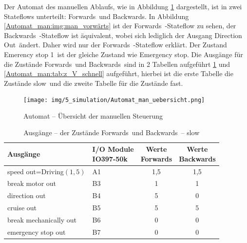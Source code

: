 Der Automat des manuellen Ablaufs, wie in Abbildung \ref{Automat_man:img:man_übersicht} dargestellt, ist in zwei Stateflows unterteilt: \frqq Forwards\flqq\ und \frqq Backwards\flqq . In Abbildung \ref{Automat_man:img:man_vorwärts} ist der \frqq Forwards\flqq\ -Stateflow zu sehen, der \frqq Backwards\flqq\ -Stateflow ist äquivalent, wobei sich lediglich der Ausgang \frqq Direction Out\flqq\ ändert. Daher wird nur der \frqq Forwards\flqq\ -Stateflow erklärt. Der Zustand \frqq Emerency stop 1\flqq\ ist der gleiche Zustand wie \frqq Emergency stop\flqq.
Die Ausgänge für die Zustände \frqq Forwards\flqq\ und \frqq Backwards\flqq\ sind in 2 Tabellen aufgeführt \ref{Automat_man:tab:z_V_langsam} und \ref{Automat_man:tab:z_V_schnell} aufgeführt, hierbei ist die erste Tabelle die Zustände \frqq slow\flqq\ und die zweite Tabelle für die Zustände \frqq fast\flqq.





\pagebreak[1]
\begin{figure}[!ht]
	\begin{center}
		\texttt{[image: img/5\_simulation/Automat\_man\_uebersicht.png]}
		\caption{Automat – Übersicht der manuellen Steuerung}
		\label{Automat_man:img:man_übersicht}
	\end{center}
\end{figure}
\pagebreak[1]


\pagebreak[1]
\begin{table}[!ht]
	\centering
	\caption{Ausgänge – der Zustände \frqq Forwards\flqq\ und \frqq Backwards\flqq\ –  \frqq slow\flqq}
	\label{Automat_man:tab:z_V_langsam}
	\begin{tabular}{llcc}
		\hline
		\textbf{Ausgänge}                             & \makecell{\textbf{I/O Module}             \\ \textbf{IO397-50k}}     & \makecell{\textbf{Werte}       \\ \textbf{\frqq Forwards\flqq}} & \makecell{\textbf{Werte}     \\ \textbf{\frqq Backwards\flqq}}  \\ \hline
		\multicolumn{1}{l|}{speed out=Driving$(1,5)$} & \multicolumn{1}{l|}{A1}       & 1,5 & 1,5 \\
		\multicolumn{1}{l|}{break motor out}          & \multicolumn{1}{l|}{B3}       & 1   & 1   \\
		\multicolumn{1}{l|}{direction out}            & \multicolumn{1}{l|}{B4}       & 5   & 0   \\
		\multicolumn{1}{l|}{cruise out}               & \multicolumn{1}{l|}{B5}       & 5   & 5   \\
		\multicolumn{1}{l|}{break mechanically out}   & \multicolumn{1}{l|}{B6}       & 0   & 0   \\
		\multicolumn{1}{l|}{emergency stop out}       & \multicolumn{1}{l|}{B7}       & 0   & 0   \\ \hline
	\end{tabular}
\end{table}
\pagebreak[1]

